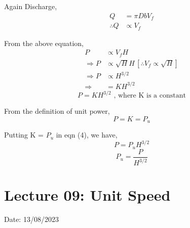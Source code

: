 \documentclass{article}
\begin{document}
\begin{multicols}{2}
        Again Discharge,
        \begin{align*}
          Q &=  \pi D b V_f \\
          \therefore Q & \propto V_f
        \end{align*}

        From the above equation,
        \begin{align*}
          P &\propto V_f H \\
          \Rightarrow P &\propto \sqrt{H} H \, [\therefore V_f \propto \sqrt{H}] \\
          \Rightarrow P &\propto H^{3/2} \\
          \Rightarrow &= K H^{3/2} 
        \end{align*}
        \begin{equation}
          P = KH^{3/2} \text{ , where K is a constant} 
        \end{equation}

        From the definition of unit power,
        $$P = K = P_u$$

        Putting K = $P_u$ in eqn (4), we have,
        $$P = P_u H^{3/2}$$
        $$P_u = \frac{P}{H^{3/2}}$$
      \end{multicols}
      \hrulefill 

      \section{Lecture 09: Unit Speed} 
    \hfill Date: 13/08/2023
\end{document}
